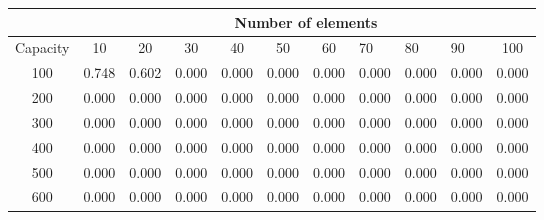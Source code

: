 \documentclass[11pt]{article}
\begin{document}
\begin{table}[h!]
\centering
\begin{tabular}{c|cccccccccc|}
\cline{2-11}
& \multicolumn{10}{c|}{Number of elements}\\ \hline
\multicolumn{1}{|c|}{Capacity} & \multicolumn{1}{c|}{10} & \multicolumn{1}{c|}{20} & \multicolumn{1}{c|}{30} & \multicolumn{1}{c|}{40} & \multicolumn{1}{c|}{50} & \multicolumn{1}{c|}{60} & \multicolumn{1}{l|}{70} & \multicolumn{1}{l|}{80} & \multicolumn{1}{l|}{90} & 100 \\ \hline
\multicolumn{1}{|c|}{100} & \multicolumn{1}{c|}{0.748} & \multicolumn{1}{c|}{0.602} & \multicolumn{1}{c|}{0.000} & \multicolumn{1}{c|}{0.000} & \multicolumn{1}{c|}{0.000} & \multicolumn{1}{c|}{0.000} & \multicolumn{1}{c|}{0.000} & \multicolumn{1}{c|}{0.000} & \multicolumn{1}{c|}{0.000}  & 0.000 \\ \hline
\multicolumn{1}{|c|}{200} & \multicolumn{1}{c|}{0.000} & \multicolumn{1}{c|}{0.000} & \multicolumn{1}{c|}{0.000} & \multicolumn{1}{c|}{0.000} & \multicolumn{1}{c|}{0.000} & \multicolumn{1}{c|}{0.000} & \multicolumn{1}{c|}{0.000} & \multicolumn{1}{c|}{0.000} & \multicolumn{1}{c|}{0.000}  & 0.000 \\ \hline
\multicolumn{1}{|c|}{300} & \multicolumn{1}{c|}{0.000} & \multicolumn{1}{c|}{0.000} & \multicolumn{1}{c|}{0.000} & \multicolumn{1}{c|}{0.000} & \multicolumn{1}{c|}{0.000} & \multicolumn{1}{c|}{0.000} & \multicolumn{1}{c|}{0.000} & \multicolumn{1}{c|}{0.000} & \multicolumn{1}{c|}{0.000}  & 0.000 \\ \hline
\multicolumn{1}{|c|}{400} & \multicolumn{1}{c|}{0.000} & \multicolumn{1}{c|}{0.000} & \multicolumn{1}{c|}{0.000} & \multicolumn{1}{c|}{0.000} & \multicolumn{1}{c|}{0.000} & \multicolumn{1}{c|}{0.000} & \multicolumn{1}{c|}{0.000} & \multicolumn{1}{c|}{0.000} & \multicolumn{1}{c|}{0.000}  & 0.000 \\ \hline
\multicolumn{1}{|c|}{500} & \multicolumn{1}{c|}{0.000} & \multicolumn{1}{c|}{0.000} & \multicolumn{1}{c|}{0.000} & \multicolumn{1}{c|}{0.000} & \multicolumn{1}{c|}{0.000} & \multicolumn{1}{c|}{0.000} & \multicolumn{1}{c|}{0.000} & \multicolumn{1}{c|}{0.000} & \multicolumn{1}{c|}{0.000}  & 0.000 \\ \hline
\multicolumn{1}{|c|}{600} & \multicolumn{1}{c|}{0.000} & \multicolumn{1}{c|}{0.000} & \multicolumn{1}{c|}{0.000} & \multicolumn{1}{c|}{0.000} & \multicolumn{1}{c|}{0.000} & \multicolumn{1}{c|}{0.000} & \multicolumn{1}{c|}{0.000} & \multicolumn{1}{c|}{0.000} & \multicolumn{1}{c|}{0.000}  & 0.000 \\ \hline

\end{tabular}
\end{table}
\end{document}
